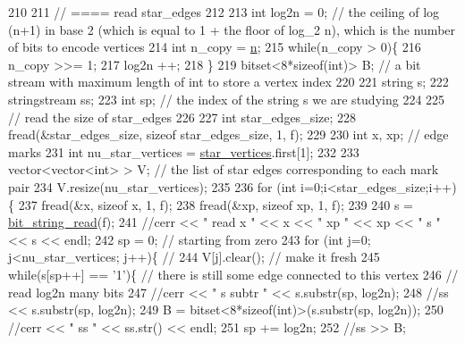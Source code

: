 \begin{DoxyCode}
210 
211   \textcolor{comment}{// ==== read star\_edges}
212 
213   \textcolor{keywordtype}{int} log2n = 0; \textcolor{comment}{// the ceiling of log (n+1) in base 2 (which is equal to 1 + the floor of log\_2 n), which
       is the number of bits to encode vertices}
214   \textcolor{keywordtype}{int} n\_copy = \hyperlink{classmarked__graph__compressed_a8d841016ddb11cfd33748c8deb6277ba}{n};
215   \textcolor{keywordflow}{while}(n\_copy > 0)\{
216     n\_copy >>= 1;
217     log2n ++;
218   \}
219   bitset<8*sizeof(int)> B; \textcolor{comment}{// a bit stream with maximum length of int to store a vertex index}
220 
221   \textcolor{keywordtype}{string} s;
222   stringstream ss;
223   \textcolor{keywordtype}{int} sp; \textcolor{comment}{// the index of the string s we are studying }
224 
225   \textcolor{comment}{// read the size of star\_edges}
226 
227   \textcolor{keywordtype}{int} star\_edges\_size;
228   fread(&star\_edges\_size, \textcolor{keyword}{sizeof} star\_edges\_size, 1, f);
229 
230   \textcolor{keywordtype}{int} x, xp; \textcolor{comment}{// edge marks}
231   \textcolor{keywordtype}{int} nu\_star\_vertices = \hyperlink{classmarked__graph__compressed_a7a4ced4586e2e353f9076bd447df5208}{star\_vertices}.first[1];
232 
233   vector<vector<int> > V; \textcolor{comment}{// the list of star edges corresponding to each mark pair}
234   V.resize(nu\_star\_vertices);
235 
236   \textcolor{keywordflow}{for} (\textcolor{keywordtype}{int} i=0;i<star\_edges\_size;i++)\{
237     fread(&x, \textcolor{keyword}{sizeof} x, 1, f);
238     fread(&xp, \textcolor{keyword}{sizeof} xp, 1, f);
239   
240     s = \hyperlink{compression__helper_8cpp_a40e8dcbc036f96b28e003e882c4890b7}{bit\_string\_read}(f);
241     \textcolor{comment}{//cerr << " read  x " << x << " xp " << xp << " s " << s << endl;}
242     sp = 0; \textcolor{comment}{// starting from zero }
243     \textcolor{keywordflow}{for} (\textcolor{keywordtype}{int} j=0; j<nu\_star\_vertices; j++)\{ \textcolor{comment}{// }
244       V[j].clear(); \textcolor{comment}{// make it fresh}
245       \textcolor{keywordflow}{while}(s[sp++] == \textcolor{charliteral}{'1'})\{ \textcolor{comment}{// there is still some edge connected to this vertex }
246         \textcolor{comment}{// read log2n many bits}
247         \textcolor{comment}{//cerr << " s subtr " << s.substr(sp, log2n);}
248         \textcolor{comment}{//ss << s.substr(sp, log2n);}
249         B = bitset<8*sizeof(int)>(s.substr(sp, log2n));
250         \textcolor{comment}{//cerr << " ss " << ss.str() << endl;}
251         sp += log2n;
252         \textcolor{comment}{//ss >> B;}

\end{DoxyCode}
